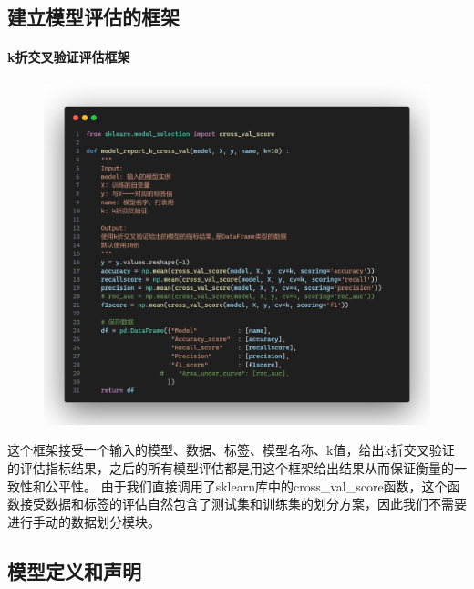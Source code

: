 \documentclass{article}
\begin{document}
\subsection{建立模型评估的框架}

\paragraph{k折交叉验证评估框架}

\begin{figure}[H]
	\centering
	\includegraphics[width=\textwidth]{./img/k-cross-temple.png}
\end{figure}

这个框架接受一个输入的模型、数据、标签、模型名称、k值，给出k折交叉验证的评估指标结果，之后的所有模型评估都是用这个框架给出结果从而保证衡量的一致性和公平性。
由于我们直接调用了sklearn库中的cross\_val\_score函数，这个函数接受数据和标签的评估自然包含了测试集和训练集的划分方案，因此我们不需要进行手动的数据划分模块。


\subsection{模型定义和声明}
\end{document}
